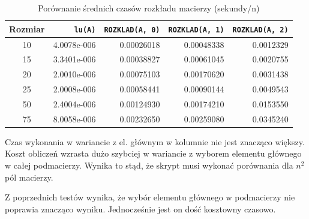 \documentclass{article}
\begin{document}
\begin{table}[H]
    \centering
    \begin{tabular}{ |c|r|r|r|r| }
        \hline
        Rozmiar & \verb|lu(A)| & \verb|ROZKLAD(A, 0)| & \verb|ROZKLAD(A, 1)| & \verb|ROZKLAD(A, 2)| \\
        \hline
        10 & 4.0078e-006 & 0.00026018 & 0.00048338 & 0.0012329 \\
        15 & 3.3401e-006 & 0.00038827 & 0.00061045 & 0.0020755 \\
        20 & 2.0010e-006 & 0.00075103 & 0.00170620 & 0.0031438 \\
        25 & 2.0008e-006 & 0.00058441 & 0.00090144 & 0.0049543 \\
        50 & 2.4004e-006 & 0.00124930 & 0.00174210 & 0.0153550 \\
        75 & 8.0058e-006 & 0.00232650 & 0.00259080 & 0.0345240 \\
        \hline
    \end{tabular}
    \caption{Porównanie średnich czasów rozkładu macierzy (sekundy/n)}
\end{table}

Czas wykonania w wariancie z el. głównym w kolumnie nie jest znacząco większy. Koszt obliczeń wzrasta dużo szybciej w wariancie z wyborem elementu głównego w całej podmacierzy. Wynika to stąd, że skrypt musi wykonać porównania dla $n^2$ pól macierzy.

Z poprzednich testów wynika, że wybór elementu głównego w podmacierzy nie poprawia znacząco wyniku. Jednocześnie jest on dość kosztowny czasowo.
\end{document}
